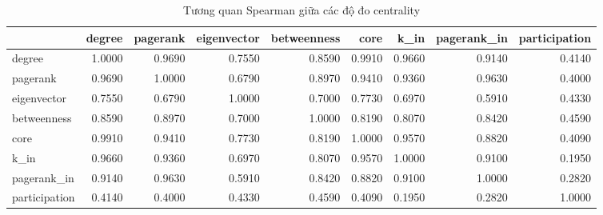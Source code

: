 \begin{table}[htbp]
\caption{Tương quan Spearman giữa các độ đo centrality}
\label{tab:rq3_centrality_corr}
\begin{tabular}{lrrrrrrrr}
\toprule
 & degree & pagerank & eigenvector & betweenness & core & k\_in & pagerank\_in & participation \\
\midrule
degree & 1.0000 & 0.9690 & 0.7550 & 0.8590 & 0.9910 & 0.9660 & 0.9140 & 0.4140 \\
pagerank & 0.9690 & 1.0000 & 0.6790 & 0.8970 & 0.9410 & 0.9360 & 0.9630 & 0.4000 \\
eigenvector & 0.7550 & 0.6790 & 1.0000 & 0.7000 & 0.7730 & 0.6970 & 0.5910 & 0.4330 \\
betweenness & 0.8590 & 0.8970 & 0.7000 & 1.0000 & 0.8190 & 0.8070 & 0.8420 & 0.4590 \\
core & 0.9910 & 0.9410 & 0.7730 & 0.8190 & 1.0000 & 0.9570 & 0.8820 & 0.4090 \\
k\_in & 0.9660 & 0.9360 & 0.6970 & 0.8070 & 0.9570 & 1.0000 & 0.9100 & 0.1950 \\
pagerank\_in & 0.9140 & 0.9630 & 0.5910 & 0.8420 & 0.8820 & 0.9100 & 1.0000 & 0.2820 \\
participation & 0.4140 & 0.4000 & 0.4330 & 0.4590 & 0.4090 & 0.1950 & 0.2820 & 1.0000 \\
\bottomrule
\end{tabular}
\end{table}
